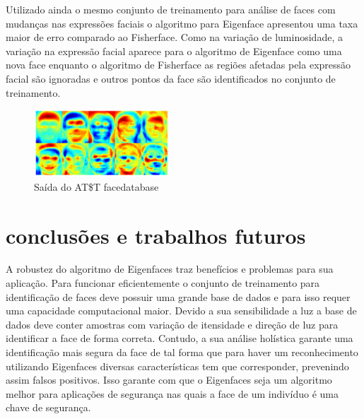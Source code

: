 

                
    Utilizado ainda o mesmo conjunto de treinamento  para análise de faces com mudanças nas expressões faciais o algoritmo para Eigenface apresentou uma taxa maior de erro comparado ao Fisherface. Como na variação de luminosidade, a variação na expressão facial aparece para o algoritmo de Eigenface como uma nova face enquanto o algoritmo de Fisherface as regiões afetadas pela expressão facial são ignoradas e outros pontos da face são identificados no conjunto de treinamento.
    
\begin{figure}[H]
    \includegraphics[width=0.45\textwidth]{conteudo/Figura2}
    \caption{Saída do AT\$T facedatabase}
    \label{Figura2}
\end{figure}


\section*{conclusões e trabalhos futuros}

	A robustez do algoritmo de Eigenfaces traz benefícios e problemas para sua aplicação. Para funcionar eficientemente o conjunto de treinamento para identificação de faces deve possuir uma grande base de dados e para isso requer uma capacidade computacional maior. Devido a sua sensibilidade a luz a base de dados deve conter amostras com variação de itensidade e direção de luz para identificar a face de forma correta. Contudo, a sua análise holística garante uma identificação mais segura da face de tal forma que para haver um reconhecimento utilizando Eigenfaces diversas características tem que corresponder, prevenindo assim falsos positivos. Isso garante com que o Eigenfaces seja um algoritmo melhor para aplicações de segurança nas quais a face de um indivíduo é uma chave de segurança.


